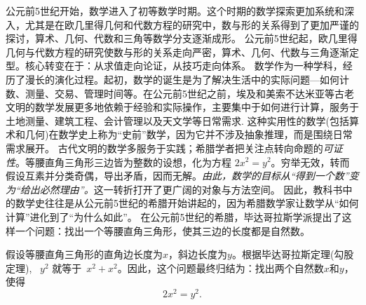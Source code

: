 公元前5世纪开始，数学进入了初等数学时期。这个时期的数学探索更加系统和深入，尤其是在欧几里得几何和代数方程的研究中，数与形的关系得到了更加严谨的探讨，算术、几何、代数和三角等数学分支逐渐成形。
公元前5世纪起，欧几里得几何与代数方程的研究使数与形的关系走向严密，算术、几何、代数与三角逐渐定型。核心转变在于：从求值走向论证，从技巧走向体系。
数学作为一种学科，经历了漫长的演化过程。起初，数学的诞生是为了解决生活中的实际问题---如何计数、测量、交易、管理时间等。在公元前5世纪之前，埃及和美索不达米亚等古老文明的数学发展更多地依赖于经验和实际操作，主要集中于如何进行计算，服务于土地测量、建筑工程、会计管理以及天文学等日常需求.
这种实用性的数学(包括算术和几何)在数学史上称为“史前”数学，因为它并不涉及抽象推理，而是围绕日常需求展开。
古代文明的数学多服务于实践；希腊学者把关注点转向命题的\emph{可证性}。等腰直角三角形三边皆为整数的设想，化为方程 $2x^2=y^2$。穷举无效，转而假设互素并分类奇偶，导出矛盾，因而无解。\emph{由此，数学的目标从“得到一个数”变为“给出必然理由”。}这一转折打开了更广阔的对象与方法空间。
因此，教科书中的数学史往往是从公元前5世纪的希腊开始讲起的，因为希腊数学家让数学从“如何计算”进化到了“为什么如此”。
在公元前5世纪的希腊，毕达哥拉斯学派提出了这样一个问题：找出一个等腰直角三角形，使其三边的长度都是自然数。


假设等腰直角三角形的直角边长度为$x$，斜边长度为$y$。根据毕达哥拉斯定理(勾股定理), ~$y^2$ 就等于~$x^2+x^2$。因此，这个问题最终归结为：找出两个自然数$x$和$y$，使得
\begin{equation}\label{eqn}
2x^2=y^2.
\end{equation}

